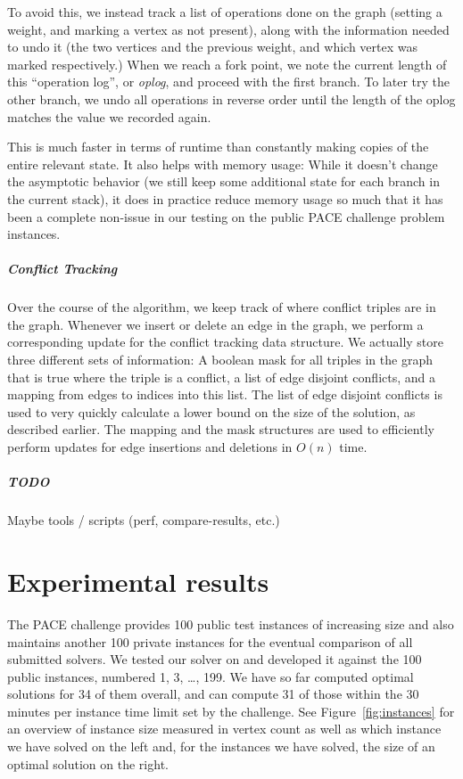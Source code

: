\documentclass[12pt,oneside,english,parskip=full,headings=small]{scrbook}
\newcommand{\todo}[1]{\paragraph{TODO} #1}
\theoremstyle{definition}
\begin{document}
To avoid this, we instead track a list of operations done on the graph (setting a weight, and
marking a vertex as not present), along with the information needed to undo it (the two vertices and
the previous weight, and which vertex was marked respectively.) When we reach a fork point, we note
the current length of this ``operation log'', or \emph{oplog}, and proceed with the first branch. To
later try the other branch, we undo all operations in reverse order until the length of the oplog
matches the value we recorded again.

This is much faster in terms of runtime than constantly making copies of the entire relevant state.
It also helps with memory usage: While it doesn't change the asymptotic behavior (we still keep
some additional state for each branch in the current stack), it does in practice reduce memory usage
so much that it has been a complete non-issue in our testing on the public PACE challenge problem
instances.

\paragraph{Conflict Tracking} Over the course of the algorithm, we keep track of where conflict
triples are in the graph. Whenever we insert or delete an edge in the graph, we perform a
corresponding update for the conflict tracking data structure. We actually store three different
sets of information: A boolean mask for all triples in the graph that is true where the triple is a
conflict, a list of edge disjoint conflicts, and a mapping from edges to indices into this list.
The list of edge disjoint conflicts is used to very quickly calculate a lower bound on the size of
the solution, as described earlier. The mapping and the mask structures are used to efficiently
perform updates for edge insertions and deletions in $O(n)$ time.

\todo Maybe tools / scripts (perf, compare-results, etc.)

\chapter{Experimental results}
\label{sec:experimental results}

The PACE challenge provides 100 public test instances of increasing size and also maintains another
100 private instances for the eventual comparison of all submitted solvers. We tested our solver on
and developed it against the 100 public instances, numbered 1, 3, \dots, 199. We have so far
computed optimal solutions for 34 of them overall, and can compute 31 of those within the 30 minutes
per instance time limit set by the challenge. See Figure~\ref{fig:instances} for an overview of
instance size measured in vertex count as well as which instance we have solved on the left and, for
the instances we have solved, the size of an optimal solution on the right.
\end{document}
